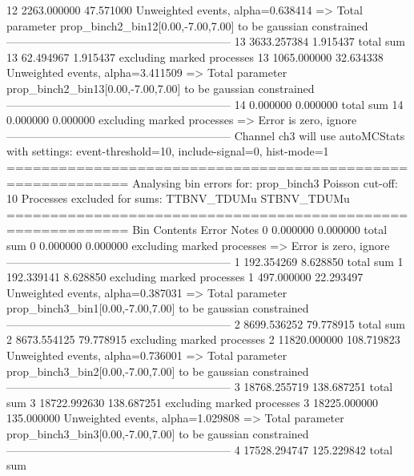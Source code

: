 12         2263.000000     47.571000       Unweighted events, alpha=0.638414
  => Total parameter prop_binch2_bin12[0.00,-7.00,7.00] to be gaussian constrained
------------------------------------------------------------
13         3633.257384     1.915437        total sum                     
13         62.494967       1.915437        excluding marked processes    
13         1065.000000     32.634338       Unweighted events, alpha=3.411509
  => Total parameter prop_binch2_bin13[0.00,-7.00,7.00] to be gaussian constrained
------------------------------------------------------------
14         0.000000        0.000000        total sum                     
14         0.000000        0.000000        excluding marked processes    
  => Error is zero, ignore      
------------------------------------------------------------
Channel ch3 will use autoMCStats with settings: event-threshold=10, include-signal=0, hist-mode=1
============================================================
Analysing bin errors for: prop_binch3
Poisson cut-off: 10
Processes excluded for sums: TTBNV_TDUMu STBNV_TDUMu
============================================================
Bin        Contents        Error           Notes                         
0          0.000000        0.000000        total sum                     
0          0.000000        0.000000        excluding marked processes    
  => Error is zero, ignore      
------------------------------------------------------------
1          192.354269      8.628850        total sum                     
1          192.339141      8.628850        excluding marked processes    
1          497.000000      22.293497       Unweighted events, alpha=0.387031
  => Total parameter prop_binch3_bin1[0.00,-7.00,7.00] to be gaussian constrained
------------------------------------------------------------
2          8699.536252     79.778915       total sum                     
2          8673.554125     79.778915       excluding marked processes    
2          11820.000000    108.719823      Unweighted events, alpha=0.736001
  => Total parameter prop_binch3_bin2[0.00,-7.00,7.00] to be gaussian constrained
------------------------------------------------------------
3          18768.255719    138.687251      total sum                     
3          18722.992630    138.687251      excluding marked processes    
3          18225.000000    135.000000      Unweighted events, alpha=1.029808
  => Total parameter prop_binch3_bin3[0.00,-7.00,7.00] to be gaussian constrained
------------------------------------------------------------
4          17528.294747    125.229842      total sum                     
